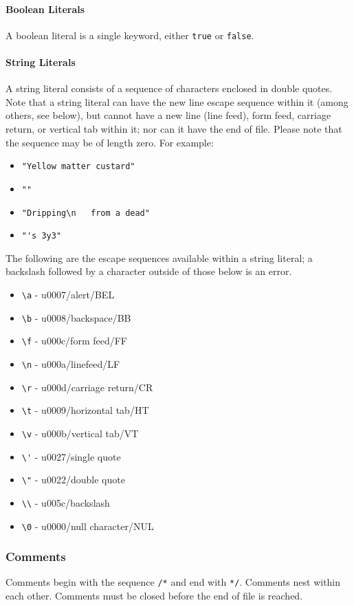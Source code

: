 \paragraph{Boolean Literals}
A boolean literal is a single keyword, either \verb!true! or \verb!false!.

\paragraph{String Literals}
A string literal consists of a sequence of characters enclosed in double quotes. Note that a string literal can have the new line escape sequence within it (among others, see below), but cannot have a new line (line feed), form feed, carriage return, or vertical tab within it; nor can it have the end of file. Please note that the sequence may be of length zero. For example:
\begin{itemize}
\item \verb!"Yellow matter custard"!
\item \verb!""!
\item \verb!"Dripping\n   from a dead"!
\item \verb!"'s 3y3"!
\end{itemize}

The following are the escape sequences available within a string literal; a backslash followed by a character outside of those below is an error.
\begin{itemize}
\item \verb!\a! - u0007/alert/BEL
\item \verb!\b! - u0008/backspace/BB
\item \verb!\f! - u000c/form feed/FF
\item \verb!\n! - u000a/linefeed/LF
\item \verb!\r! - u000d/carriage return/CR
\item \verb!\t! - u0009/horizontal tab/HT
\item \verb!\v! - u000b/vertical tab/VT
\item \verb!\'! - u0027/single quote
\item \verb!\"! - u0022/double quote
\item \verb!\\! - u005c/backslash
\item \verb!\0! - u0000/null character/NUL 
\end{itemize}

\subsubsection{Comments}
Comments begin with the sequence \verb!/*! and end with \verb!*/!. Comments nest within each other.  Comments must be closed before the end of file is reached.

